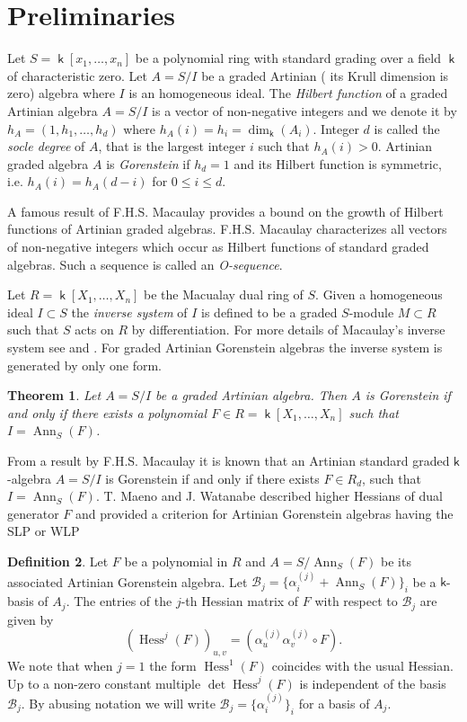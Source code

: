 \documentclass[12pt]{amsart}
\numberwithin{equation}{section}
\theoremstyle{plain} \newtheorem{theorem}{Theorem}[section]
\theoremstyle{definition} \newtheorem{definition}[theorem]{Definition}
\DeclareMathOperator{\Hess}{Hess}\DeclareMathOperator{\rk}{rk}
\DeclareMathOperator{\ann}{Ann}\DeclareMathOperator{\Char}{char}
\DeclareMathOperator{\K}{\mathsf{k}}
\begin{document}
\section{Preliminaries}
Let $S = \K[x_1,\dots ,x_n]$ be a polynomial ring with standard grading over a field $\K$ of characteristic zero. Let $A=S/I$ be a graded Artinian  ( its Krull dimension is zero) algebra where $I$ is an homogeneous ideal. 
The \emph{Hilbert function} of a graded Artinian  algebra $A=S/I$ is  a vector of non-negative integers and we denote it by $h_A=(1,h_1,\dots ,h_d)$ where  $h_A(i)=h_i=\dim_{\K}(A_i)$. Integer $d$ is called the \emph{socle degree} of $A$, that is the largest integer $i$ such that $h_A(i)>0$. Artinian  graded algebra $A$ is \emph{  Gorenstein} if $h_d=1$ and its Hilbert function is symmetric, i.e. $h_A(i)=h_A(d-i)$ for $0\leq i\leq d$.\par 
A famous result of F.H.S. Macaulay \cite{Macaulay}  provides a bound on the growth of Hilbert functions of Artinian  graded algebras. F.H.S. Macaulay characterizes all vectors of non-negative integers which occur as Hilbert functions of standard graded algebras. Such a sequence is called an \emph{O-sequence}. \par 
Let $R=\K[X_1,\dots , X_n ]$ be the Macualay dual ring of $S$. Given a homogeneous ideal $I\subset S$ the \emph{inverse system} of $I$ is defined to be a graded $S$-module $M\subset R$ such that $S$ acts on  $R$ by differentiation. For more details of Macaulay's inverse system see \cite{Geramita} and \cite{IK}.
For graded Artinian    Gorenstein algebras the inverse system is generated by only one form.
\begin{theorem}\cite{MW}\label{dualGen}
 Let $A=S/I$ be a graded Artinian  algebra. Then $A$ is   Gorenstein if and only if there exists a polynomial $F\in R =\K[X_1,\dots ,X_n]$ such that $I=\ann_S(F)$.
 \end{theorem}
From  a  result by F.H.S. Macaulay \cite{F.H.S} it is known that an Artinian standard graded $\mathsf{k}$-algebra $A=S/I$ is Gorenstein if and only if there exists $F\in R_d$, such that $I=\ann_S(F)$.  T. Maeno and J. Watanabe \cite{MW} described higher Hessians of dual generator $F$ and provided a criterion for Artinian Gorenstein algebras having the SLP or WLP
\begin{definition}\cite[Definition 3.1]{MW}
Let $F$ be a polynomial in $R$ and $A= S/\ann_S(F)$ be its associated Artinian Gorenstein algebra. Let $\mathcal{B}_{j} = \lbrace \alpha^{(j)}_i+\ann_S(F) \rbrace_i$ be a  $\mathsf{k}$-basis of $A_j$. The entries of the  $j$-th Hessian matrix of $F$ with respect to $\mathcal{B}_j$ are given  by
$$
(\Hess^j(F))_{u,v}=(\alpha^{(j)}_u\alpha^{(j)}_v \circ F).
$$
We note that when $j=1$ the form $\Hess^1(F)$ coincides with the usual Hessian. Up to  a non-zero constant multiple  $\det \Hess^j(F)$ is independent of the basis $\mathcal{B}_j$.  By abusing notation we will write   $\mathcal{B}_{j} = \lbrace \alpha^{(j)}_i \rbrace_i$ for a basis of $A_j$.
\end{definition}
\end{document}
